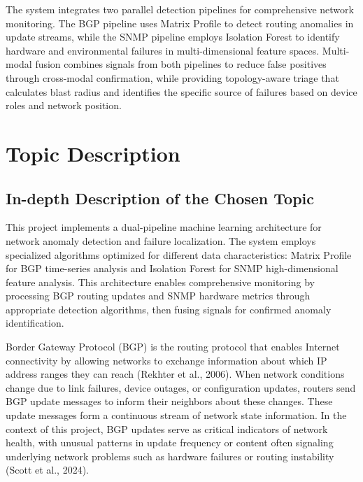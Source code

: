 \documentclass[11pt]{article}
\begin{document}
The system integrates two parallel detection pipelines for comprehensive network monitoring. The BGP pipeline uses Matrix Profile to detect routing anomalies in update streams, while the SNMP pipeline employs Isolation Forest to identify hardware and environmental failures in multi-dimensional feature spaces. Multi-modal fusion combines signals from both pipelines to reduce false positives through cross-modal confirmation, while providing topology-aware triage that calculates blast radius and identifies the specific source of failures based on device roles and network position.

\section{Topic Description}

\subsection{In-depth Description of the Chosen Topic}

This project implements a dual-pipeline machine learning architecture for network anomaly detection and failure localization. The system employs specialized algorithms optimized for different data characteristics: Matrix Profile for BGP time-series analysis and Isolation Forest for SNMP high-dimensional feature analysis. This architecture enables comprehensive monitoring by processing BGP routing updates and SNMP hardware metrics through appropriate detection algorithms, then fusing signals for confirmed anomaly identification.

Border Gateway Protocol (BGP) is the routing protocol that enables Internet connectivity by allowing networks to exchange information about which IP address ranges they can reach (Rekhter et al., 2006). When network conditions change due to link failures, device outages, or configuration updates, routers send BGP update messages to inform their neighbors about these changes. These update messages form a continuous stream of network state information. In the context of this project, BGP updates serve as critical indicators of network health, with unusual patterns in update frequency or content often signaling underlying network problems such as hardware failures or routing instability (Scott et al., 2024).
\end{document}
